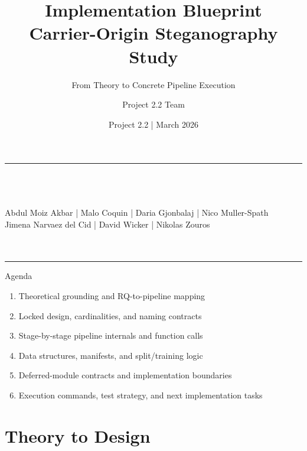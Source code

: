 \documentclass[aspectratio=169,11pt]{beamer}
\title{Implementation Blueprint\\Carrier-Origin Steganography Study}
\subtitle{From Theory to Concrete Pipeline Execution}
\author[Project 2.2 Team]{Project 2.2 Team}
\institute{Department of Advanced Computing Sciences\\Maastricht University}
\date{Project 2.2 \;|\; March 2026}
\newcommand{\teamauthors}{Abdul Moiz Akbar \;|\; Malo Coquin \;|\; Daria Gjonbalaj \;|\; Nico Muller-Spath\\Jimena Narvaez del Cid \;|\; David Wicker \;|\; Nikolas Zouros}
\begin{document}
\begin{frame}[plain]
\vfill
\begin{center}
{\color{umorange}\rule{0.42\textwidth}{2pt}}\\[12pt]
{\LARGE\bfseries\color{umdark}\inserttitle}\\[10pt]
{\normalsize\color{umgray}\insertsubtitle}\\[16pt]
{\small\color{umdark}\teamauthors}\\[8pt]
{\small\color{umorange}\insertinstitute}\\[8pt]
{\footnotesize\color{umgray}\insertdate}\\[12pt]
{\color{umorange}\rule{0.42\textwidth}{2pt}}
\end{center}
\vfill
\end{frame}

\begin{frame}{Agenda}
\begin{enumerate}
\item Theoretical grounding and RQ-to-pipeline mapping
\item Locked design, cardinalities, and naming contracts
\item Stage-by-stage pipeline internals and function calls
\item Data structures, manifests, and split/training logic
\item Deferred-module contracts and implementation boundaries
\item Execution commands, test strategy, and next implementation tasks
\end{enumerate}
\end{frame}

\section{Theory to Design}
\end{document}
